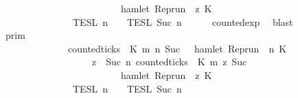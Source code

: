 \begin{isabellebody}
\ \ \ \ \ \ \ \ \ \ \ \ \ \ \ \ \ \ \ \ \ \ \ \ \ \ \ \ {\isasymlongrightarrow}\ hamlet\ {\isacharparenleft}{\isacharparenleft}Rep{\isacharunderscore}run\ {\isasymrho}{\isacharparenright}\ z\ K\ {\isacharbraceright}\isanewline
\ \ \ \ \ \ \ \ \ \ \ \ \ \ \ \ {\isasyminter}\ {\isasymlbrakk}{\isasymlbrakk}\ {\isasymPsi}\ {\isasymrbrakk}{\isasymrbrakk}\isactrlsub T\isactrlsub E\isactrlsub S\isactrlsub L\isactrlbsup {\isasymge}\ n\isactrlesup \ {\isasyminter}\ {\isasymlbrakk}{\isasymlbrakk}\ {\isasymPhi}\ {\isasymrbrakk}{\isasymrbrakk}\isactrlsub T\isactrlsub E\isactrlsub S\isactrlsub L\isactrlbsup {\isasymge}\ Suc\ n\isactrlesup {\isacartoucheclose}\isanewline
\ \ \ \ \isamarkupfalse%
\ counted{\isacharunderscore}exp\ \isamarkupfalse%
\ blast\isanewline
\ \ \isamarkupfalse%
\ \isamarkupfalse%
\ {\isacartoucheopen}{\isachardot}{\isachardot}{\isachardot}\ {\isacharequal}\ {\isasymlbrakk}{\isasymlbrakk}\ {\isasymGamma}\ {\isasymrbrakk}{\isasymrbrakk}\isactrlsub p\isactrlsub r\isactrlsub i\isactrlsub m\ \isanewline
\ \ \ \ \ \ \ \ \ \ \ \ \ \ \ \ {\isasyminter}\ {\isacharbraceleft}{\isasymrho}{\isachardot}\ {\isacharparenleft}{\isasymnot}counted{\isacharunderscore}ticks\ {\isasymrho}\ K\ m\ n\ {\isacharparenleft}Suc\ {}{\isacharparenright}\ {\isasymor}\ hamlet\ {\isacharparenleft}{\isacharparenleft}Rep{\isacharunderscore}run\ {\isasymrho}{\isacharparenright}\ n\ K\isanewline
\ \ \ \ \ \ \ \ \ \ \ \ \ \ \ \ \ \ \ \ \ \ {\isasymand}\ {\isacharparenleft}{\isasymforall}z\ {\isasymge}\ Suc\ n{\isachardot}\ {\isacharparenleft}counted{\isacharunderscore}ticks\ {\isasymrho}\ K\ m\ z\ {\isacharparenleft}Suc\ {}{\isacharparenright}{\isacharparenright}\isanewline
\ \ \ \ \ \ \ \ \ \ \ \ \ \ \ \ \ \ \ \ \ \ \ \ \ \ \ \ {\isasymlongrightarrow}\ hamlet\ {\isacharparenleft}{\isacharparenleft}Rep{\isacharunderscore}run\ {\isasymrho}{\isacharparenright}\ z\ K\ {\isacharbraceright}\isanewline
\ \ \ \ \ \ \ \ \ \ \ \ \ \ \ \ {\isasyminter}\ {\isasymlbrakk}{\isasymlbrakk}\ {\isasymPsi}\ {\isasymrbrakk}{\isasymrbrakk}\isactrlsub T\isactrlsub E\isactrlsub S\isactrlsub L\isactrlbsup {\isasymge}\ n\isactrlesup \ {\isasyminter}\ {\isasymlbrakk}{\isasymlbrakk}\ {\isasymPhi}\ {\isasymrbrakk}{\isasymrbrakk}\isactrlsub T\isactrlsub E\isactrlsub S\isactrlsub L\isactrlbsup {\isasymge}\ Suc\ n\isactrlesup {\isacartoucheclose}\isanewline

\end{isabellebody}

